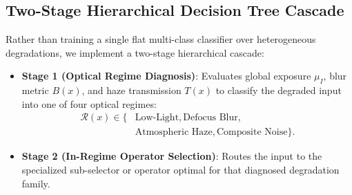 \documentclass[journal]{IEEEtran}
\begin{document}
\subsection{Two-Stage Hierarchical Decision Tree Cascade}
Rather than training a single flat multi-class classifier over heterogeneous degradations, we implement a two-stage hierarchical cascade:
\begin{itemize}
    \item \textbf{Stage 1 (Optical Regime Diagnosis)}: Evaluates global exposure $\mu_I$, blur metric $B(x)$, and haze transmission $T(x)$ to classify the degraded input into one of four optical regimes:
    \begin{equation}
    \begin{aligned}
    \mathcal{R}(x) \in \{&\text{Low-Light}, \text{Defocus Blur}, \\
    &\text{Atmospheric Haze}, \text{Composite Noise}\}.
    \end{aligned}
    \end{equation}
    \item \textbf{Stage 2 (In-Regime Operator Selection)}: Routes the input to the specialized sub-selector or operator optimal for that diagnosed degradation family.
\end{itemize}

\begin{table}[!t]
\centering
\caption{Multi-Degradation Performance Across Diverse Optical Regimes}
\label{tab:multi_degradation}
\end{table}
\end{document}

